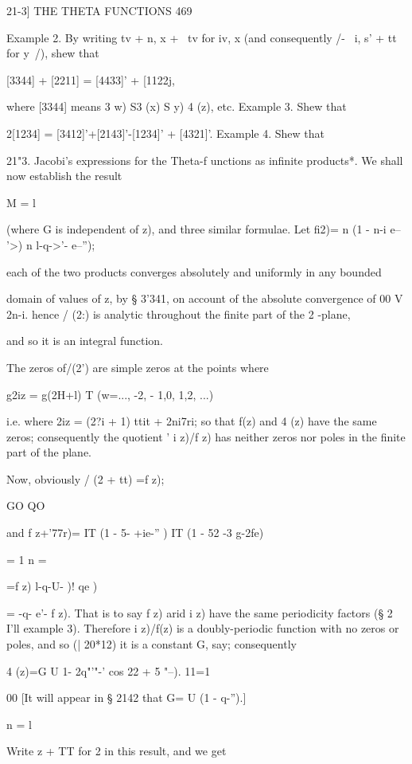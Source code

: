 21-3] THE THETA FUNCTIONS 469

Example 2. By writing tv + n, x + \ tv for iv, x (and consequently /-
\ i, s' + tt for y\ /), shew that

[3344] + [2211] = [4433]' + [1122j,

where [3344] means 3 w) S3 (x) S y) 4 (z), etc. Example 3. Shew that

2[1234] = [3412]'+[2143]'-[1234]' + [4321]'. Example 4. Shew that

21"3. Jacobi's expressions for the Theta-f unctions as infinite
products*. We shall now establish the result

M = l

(where G is independent of z), and three similar formulae. Let fi2)= n
(1 - n-i e-- '>) n l-q->'- e--'');

each of the two products converges absolutely and uniformly in any
bounded

domain of values of z, by § 3'341, on account of the absolute
convergence of 00 V 2n-i. hence / (2:) is analytic throughout the
finite part of the 2 -plane,

and so it is an integral function.

The zeros of/(2') are simple zeros at the points where

g2iz = g(2H+l) T (w=..., -2, - 1,0, 1,2, ...)

i.e. where 2iz = (2?i + 1) ttit + 2ni7ri; so that f(z) and 4 (z) have
the same zeros; consequently the quotient ' i z)/f z) has neither
zeros nor poles in the finite part of the plane.

Now, obviously / (2 + tt) =f z);

GO QO

and f z+'77r)= IT (1 - 5- +ie-'' ) IT (1 - 52 -3 g-2fe)

  = 1 n = \

=f z) l-q-U- )! qe )

= -q- e'- f z). That is to say f z) arid i z) have the same
periodicity factors (§ 2 I'll example 3). Therefore i z)/f(z) is a
doubly-periodic function with no zeros or poles, and so (| 20*12) it
is a constant G, say; consequently

 4 (z)=G U 1- 2q"'"-' cos 22 + 5 "--). 11=1

00 [It will appear in § 2142 that G= U (1 - q-'').]

n = l

Write z + TT for 2 in this result, and we get


